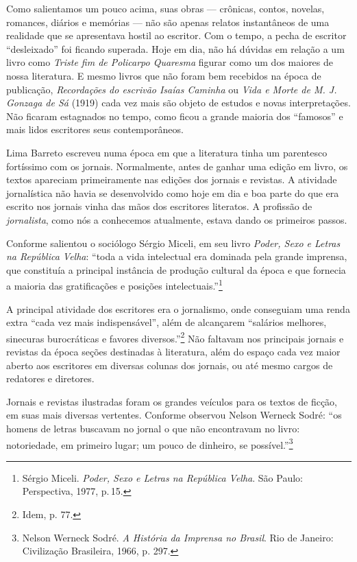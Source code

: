 \documentclass[11pt]{extarticle}
\begin{document}
{{Como salientamos um pouco acima, suas obras --- crônicas, contos,
novelas, romances, diários e memórias --- não são apenas relatos
instantâneos de uma realidade que se apresentava hostil ao escritor. Com
o tempo, a pecha de escritor ``desleixado'' foi ficando superada. Hoje
em dia, não há dúvidas em relação a um livro como \emph{Triste fim de
Policarpo Quaresma} figurar como um dos maiores de nossa literatura. E
mesmo livros que não foram bem recebidos na época de publicação,
\emph{Recordações do escrivão Isaías Caminha} ou \emph{Vida e Morte de
M. J. Gonzaga de Sá} (1919) cada vez mais são objeto de estudos e novas
interpretações. Não ficaram estagnados no tempo, como ficou a grande
maioria dos ``famosos'' e mais lidos escritores seus contemporâneos.

Lima Barreto escreveu numa época em que a literatura tinha um parentesco
fortíssimo com os jornais. Normalmente, antes de ganhar uma edição em
livro, os textos apareciam primeiramente nas edições dos jornais e
revistas. A atividade jornalística não havia se desenvolvido como hoje
em dia e boa parte do que era escrito nos jornais vinha das mãos dos
escritores literatos. A profissão de \emph{jornalista}, como nós a
conhecemos atualmente, estava dando os primeiros passos.

Conforme salientou o sociólogo Sérgio Miceli, em seu livro \emph{Poder,
Sexo e Letras na República Velha}: ``toda a vida intelectual era
dominada pela grande imprensa, que constituía a principal instância de
produção cultural da época e que fornecia a maioria das gratificações e
posições intelectuais.''\footnote{Sérgio Miceli. \emph{Poder, Sexo e
  Letras na República Velha}. São Paulo: Perspectiva, 1977, p.\,15.}

A principal atividade dos escritores era o jornalismo, onde conseguiam
uma renda extra ``cada vez mais indispensável'', além de alcançarem
``salários melhores, sinecuras burocráticas e favores
diversos.''\footnote{Idem, p. 77.} Não faltavam nos principais jornais e
revistas da época seções destinadas à literatura, além do espaço cada
vez maior aberto aos escritores em diversas colunas dos jornais, ou até
mesmo cargos de redatores e diretores.

Jornais e revistas ilustradas foram os grandes veículos para os textos
de ficção, em suas mais diversas vertentes. Conforme observou Nelson
Werneck Sodré: ``os homens de letras buscavam no jornal o que não
encontravam no livro: notoriedade, em primeiro lugar; um pouco de
dinheiro, se possível.''\footnote{Nelson Werneck Sodré. \emph{A História
  da Imprensa no Brasil}. Rio de Janeiro: Civilização Brasileira, 1966,
  p. 297.}

}}
\end{document}
